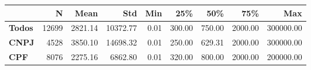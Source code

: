 \begin{tabular}{lrrrrrrrr}
\toprule
{} &     N &    Mean &      Std &  Min &    25\% &    50\% &     75\% &       Max \\
\midrule
\textbf{Todos} & 12699 & 2821.14 & 10372.77 & 0.01 & 300.00 & 750.00 & 2000.00 & 300000.00 \\
\textbf{CNPJ } &  4528 & 3850.10 & 14698.32 & 0.01 & 250.00 & 629.31 & 2000.00 & 300000.00 \\
\textbf{CPF  } &  8076 & 2275.16 &  6862.80 & 0.01 & 320.00 & 800.00 & 2000.00 & 200000.00 \\
\bottomrule
\end{tabular}
